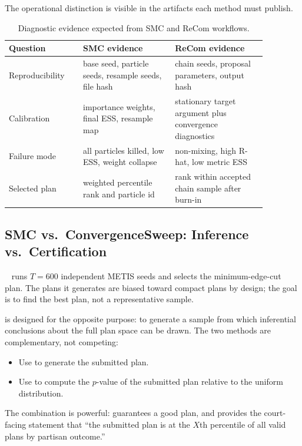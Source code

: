 The operational distinction is visible in the artifacts each method must
publish.

\begin{table}[ht]
\centering
\caption{Diagnostic evidence expected from SMC and ReCom workflows.}
\label{tab:diagnostic-comparison}
\begin{tabular}{p{0.25\linewidth}p{0.31\linewidth}p{0.31\linewidth}}
\toprule
Question & SMC evidence & ReCom evidence \\
\midrule
Reproducibility & base seed, particle seeds, resample seeds, file hash & chain
seeds, proposal parameters, output hash \\
Calibration & importance weights, final ESS, resample map & stationary target
argument plus convergence diagnostics \\
Failure mode & all particles killed, low ESS, weight collapse & non-mixing,
high R-hat, low metric ESS \\
Selected plan & weighted percentile rank and particle id & rank within accepted
chain sample after burn-in \\
\bottomrule
\end{tabular}
\end{table}

\subsection{SMC vs.\ ConvergenceSweep: Inference vs.\ Certification}

\cs{}~\citep{b11paper} runs $T = 600$ independent METIS seeds and selects the
minimum-edge-cut plan.
The plans it generates are biased toward compact plans by design; the goal is
to find the best plan, not a representative sample.

\smc{} is designed for the opposite purpose: to generate a sample from which
inferential conclusions about the full plan space can be drawn.
The two methods are complementary, not competing:

\begin{itemize}
  \item Use \cs{} to generate the submitted plan.
  \item Use \smc{} to compute the $p$-value of the submitted plan relative to
        the uniform distribution.
\end{itemize}

The combination is powerful: \cs{} guarantees a good plan, and \smc{}
provides the court-facing statement that ``the submitted plan is at the
$X$th percentile of all valid plans by partisan outcome.''

